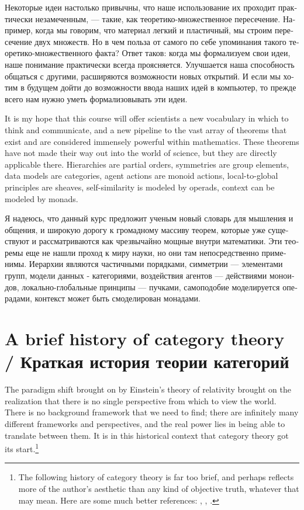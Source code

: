\documentclass[a4paper]{book}
\theoremstyle{myth}
\begin{document}
\begin{russian}
Некоторые идеи настолько привычны, что наше использование их проходит практически незамеченным, — такие, как теоретико-множественное пересечение. Например, когда мы говорим, что материал легкий и пластичный, мы строим пересечение двух множеств. Но в чем польза от самого по себе упоминания такого теоретико-множественного факта? Ответ таков: когда мы формализуем свои идеи, наше понимание практически всегда проясняется. Улучшается наша способность общаться с другими, расширяются возможности новых открытий. И если мы хотим в будущем дойти до возможности ввода наших идей в компьютер, то прежде всего нам нужно уметь формализовывать эти идеи. 

It is my hope that this course will offer scientists a new vocabulary in which to think and communicate, and a new pipeline to the vast array of theorems that exist and are considered immensely powerful within mathematics. These theorems have not made their way out into the world of science, but they are directly applicable there. Hierarchies are partial orders, symmetries are group elements, data models are categories, agent actions are monoid actions, local-to-global principles are sheaves, self-similarity is modeled by operads, context can be modeled by monads.

Я надеюсь, что данный курс предложит ученым новый словарь для мышления и общения, и широкую дорогу к громадному массиву теорем, которые уже существуют и рассматриваются как чрезвычайно мощные внутри математики. Эти теоремы еще не нашли проход к миру науки, но они там непосредственно применимы. Иерархии являются частичными порядками, симметрии — элементами групп, модели данных - категориями, воздействия агентов — действиями моноидов, локально-глобальные принципы — пучками, самоподобие моделируется операдами, контекст может быть смоделирован монадами. 


\section{A brief history of category theory /  Краткая история теории категорий }

The paradigm shift brought on by Einstein's theory of relativity brought on the realization that there is no single perspective from which to view the world. There is no background framework that we need to find; there are infinitely many different frameworks and perspectives, and the real power lies in being able to translate between them. It is in this historical context that category theory got its start.\footnote{The following history of category theory is far too brief, and perhaps reflects more of the author's aesthetic than any kind of objective truth, whatever that may mean. Here are some much better references: \cite{Kro}, \cite{Mar1}, \cite{LM}.}



\end{russian}
\end{document}
